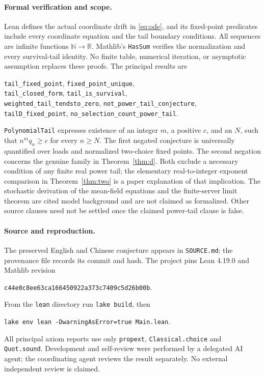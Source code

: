 \documentclass[11pt]{article}
\begin{document}
\paragraph{Formal verification and scope.}
Lean defines the actual coordinate drift in \eqref{eq:ode}, and its
fixed-point predicates include every coordinate equation and the
tail boundary conditions. All sequences are infinite functions
$\mathbb N\to\mathbb R$. Mathlib's \texttt{HasSum} verifies the
normalization and every survival-tail identity. No finite table,
numerical iteration, or asymptotic assumption replaces these proofs.
The principal results are
\begin{center}
\texttt{tail\_fixed\_point}, \texttt{fixed\_point\_unique},\\
\texttt{tail\_closed\_form}, \texttt{tail\_is\_survival},\\
\texttt{weighted\_tail\_tendsto\_zero},
\texttt{not\_power\_tail\_conjecture},\\
\texttt{tailD\_fixed\_point},
\texttt{no\_selection\_count\_power\_tail}.
\end{center}
\texttt{PolynomialTail} expresses existence of an integer $m$, a
positive $c$, and an $N$, such that $n^m q_n\ge c$ for every
$n\ge N$. The first negated conjecture is universally quantified
over loads and normalized two-choice fixed points. The second
negation concerns the genuine family in Theorem~\ref{thm:d}.
Both exclude a necessary condition of any finite real power tail;
the elementary real-to-integer exponent comparison in
Theorem~\ref{thm:two} is a paper explanation of that implication.
The stochastic derivation of the mean-field equations and the
finite-server limit theorem are cited model background and are not
claimed as formalized. Other source clauses need not be settled
once the claimed power-tail clause is false.

\paragraph{Source and reproduction.}
The preserved English and Chinese conjecture appears in
\texttt{SOURCE.md}; the provenance file records its commit and hash.
The project pins Lean 4.19.0 and Mathlib revision
\begin{center}\texttt{c44e0c8ee63ca166450922a373c7409c5d26b00b}.\end{center}
From the \texttt{lean} directory run \texttt{lake build}, then
\begin{center}\texttt{lake env lean -DwarningAsError=true Main.lean}.\end{center}
All principal axiom reports use only \texttt{propext},
\texttt{Classical.choice} and \texttt{Quot.sound}.
Development and self-review were performed by a delegated AI agent;
the coordinating agent reviews the result separately. No external
independent review is claimed.
\end{document}
